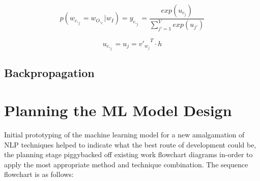\begin{equation}
    p(w_{c,_j} = w_{O,_c} | w_{I}) = y_{c,_j} = \frac{exp(u_{c_j})}{\sum_{j' = 1}^{V} exp(u_{j'})}
\end{equation}


\begin{equation}
    u_{c,_j} = u_{j} = {v'_{w_j}} ^ T \cdot h
\end{equation}

\subsection{Backpropagation}


\section{Planning the ML Model Design}

Initial prototyping of the machine learning model for a new amalgamation of NLP techniques helped to indicate what the best route of development could be, the planning stage piggybacked off existing work flowchart diagrams in-order to apply the most appropriate method and technique combination. The sequence flowchart is as follows:

